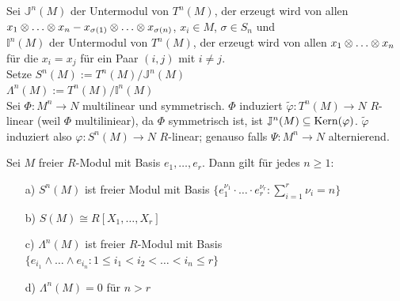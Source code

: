 \documentclass[a4paper, 10pt]{report}
\begin{document}
 \begin{Bew}
  Sei $\mathbb{J}^n(M)$ der Untermodul von $T^n(M)$, der erzeugt wird von allen\\
  $x_1 \ten \dots \ten x_n -x_{\sigma(1)} \ten \dots \ten x_{\sigma(n)}$,
  $x_i \in M$, $ \sigma \in S_n$ und \\
  $\mathbb{I}^n(M)$ der Untermodul von $T^n(M)$, der erzeugt wird von allen
  $x_1 \ten \dots \ten x_n$ für die $x_i = x_j$ für ein Paar $(i,j)$ mit $i \neq j$.\\
  Setze $S^n(M) := T^n(M)/\mathbb{J}^n(M)$\\
  $\Lambda^n(M) := T^n(M)/\mathbb{I}^n(M)$ \\
  Sei $\Phi: M^n \rightarrow N$ multilinear und symmetrisch. $\Phi$ induziert 
  $\tilde{\varphi}:T^n(M) \rightarrow N$ $R$-linear (weil $\Phi$ multiliniear), da $\Phi$ symmetrisch ist, ist
  $\mathbb{J}^n(M) \subseteq \mathrm{Kern}(\varphi)$. $\tilde{\varphi}$ induziert also $\varphi:S^n(M) \rightarrow N$
  $R$-linear; genauso falls $\Psi : M^n \rightarrow N$ alternierend.
 \end{Bew}

 \begin{Prop}
  Sei $M$ freier $R$-Modul mit Basis $e_1, \dots, e_r$. Dann gilt für jedes $n \geq 1$:
  \begin{enumerate}
   \item[ a) ] $S^n(M)$ ist freier Modul mit Basis $\{e_1^{\nu_1} \cdot \dots
   \cdot e_r^{\nu_r}: \sum_{i=1}^{r}{\nu_i} =  n \}$
   \item[ b) ] $S(M) \cong R[X_1, \dots, X_r]$
   \item[ c) ] $\Lambda^n(M)$ ist freier $R$-Modul mit Basis \\
    $\{e_{i_1} \wedge \dots \wedge e_{i_n}: 1 \leq i_1 < i_2 < \dots < i_n \leq r \}$
   \item[ d) ] $\Lambda^n(M) = 0$ für $n > r$ 
  \end{enumerate}
 \end{Prop}
 
\end{document}
